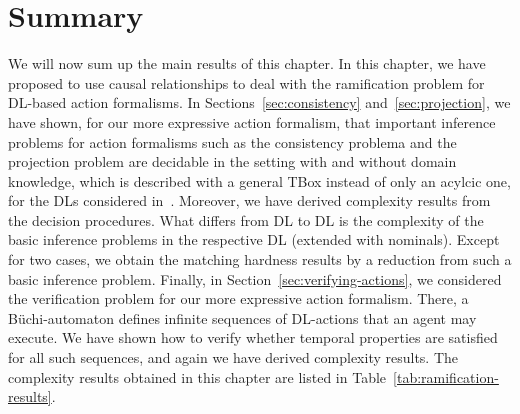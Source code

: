 \section{Summary}\label{sec:ramifications-summary}

We will now sum up the main results of this chapter.
%
In this chapter, we have proposed to use causal relationships to deal with the
ramification problem for DL-based action formalisms.  In
Sections~\ref{sec:consistency} and~\ref{sec:projection}, we have shown, for our
more expressive action formalism, that important inference problems for action
formalisms such as the consistency problema and the projection problem are
decidable in the setting with and without domain knowledge, which is described
with a general TBox instead of only an acylcic one, for the DLs considered
in~\cite{BLM+-AAAI05}.  Moreover, we have derived complexity results from the
decision procedures.  What differs from DL to DL is the complexity of the basic
inference problems in the respective DL (extended with nominals).  Except for
two cases, we obtain the matching hardness results by a reduction from such a
basic inference problem.  Finally, in Section~\ref{sec:verifying-actions}, we
considered the verification problem for our more expressive action formalism.
There, a Büchi-automaton defines infinite sequences of DL-actions that an agent
may execute.  We have shown how to verify whether temporal properties are
satisfied for all such sequences, and again we have derived complexity results.
%
The complexity results obtained in this chapter are listed in
Table~\ref{tab:ramification-results}.
%
